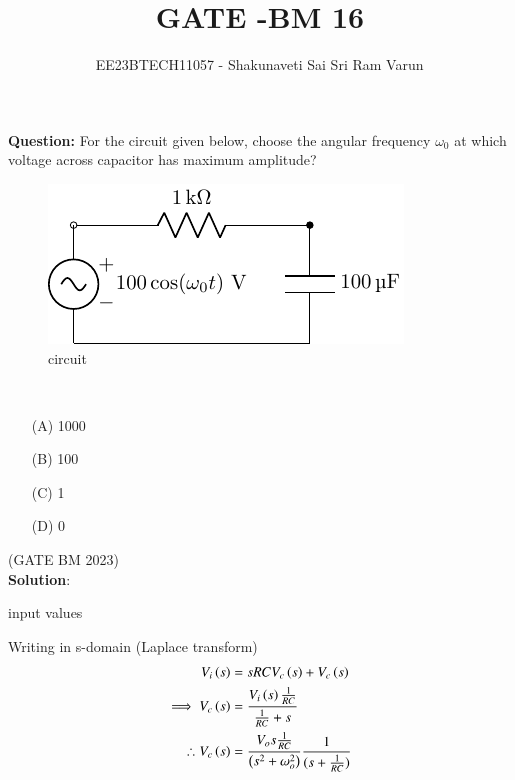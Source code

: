 \documentclass[journal,12pt,twocolumn]{IEEEtran}
\theoremstyle{remark}
\begin{document}

\vspace{3cm}

\title{GATE -BM 16}
\author{EE23BTECH11057 - Shakunaveti Sai Sri Ram Varun$^{}$%
}
\maketitle
\newpage
\bigskip
\vspace{2cm}
\textbf{Question: }
For the circuit given below, choose the angular frequency $ \omega_0$ at which voltage across capacitor has maximum amplitude?
\begin{figure}[h!]
    \includegraphics[width = \columnwidth]{figs/c_fig1.pdf}
    \caption{circuit }
    \centering
    \label{fig: bm_16_fig_1}
\end{figure}\\
\begin{enumerate}
    \item[(A)] 1000\\
    \item[(B)] 100\\
    \item[(C)] 1\\
    \item[(D)] 0   
\end{enumerate}
\hfill(GATE BM 2023)\\
\textbf{Solution}:\\
\begin{table}[htbp] 
\centering

\caption{input values}
\label{tab: table-bm16}
\end{table}
Writing in s-domain (Laplace transform)
\begin{align}
V_i\left(s\right) &= sRCV_c\left(s\right) + V_c\left(s\right)\\
\implies V_c\left(s\right)&=\frac{V_i\left(s\right)\frac{1}{RC}}{\frac{1}{RC}+s}\\
\therefore V_c\left(s\right) &= \frac{V_os\frac{1}{RC}}{\left(s^2+ \omega_o^2\right)}\frac{1}{(s+\frac{1}{RC})}
\end{align}
\end{document}

